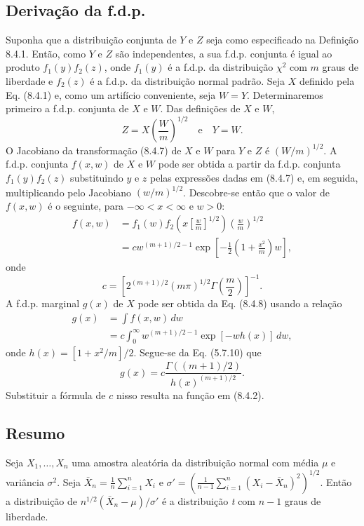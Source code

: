 \subsection*{Derivação da f.d.p.}

Suponha que a distribuição conjunta de $Y$ e $Z$ seja como especificado na Definição 8.4.1. Então, como $Y$ e $Z$ são independentes, a sua f.d.p. conjunta é igual ao produto $f_1(y)f_2(z)$, onde $f_1(y)$ é a f.d.p. da distribuição $\chi^2$ com $m$ graus de liberdade e $f_2(z)$ é a f.d.p. da distribuição normal padrão. Seja $X$ definido pela Eq. (8.4.1) e, como um artifício conveniente, seja $W=Y$. Determinaremos primeiro a f.d.p. conjunta de $X$ e $W$.
Das definições de $X$ e $W$,
\begin{equation} \label{eq:8.4.7}
    Z = X \left(\frac{W}{m}\right)^{1/2} \quad \text{e} \quad Y = W.
\end{equation}
O Jacobiano da transformação (8.4.7) de $X$ e $W$ para $Y$ e $Z$ é $(W/m)^{1/2}$. A f.d.p. conjunta $f(x, w)$ de $X$ e $W$ pode ser obtida a partir da f.d.p. conjunta $f_1(y)f_2(z)$ substituindo $y$ e $z$ pelas expressões dadas em (8.4.7) e, em seguida, multiplicando pelo Jacobiano $(w/m)^{1/2}$. Descobre-se então que o valor de $f(x, w)$ é o seguinte, para $-\infty < x < \infty$ e $w > 0$:
\begin{align} \label{eq:8.4.8}
    f(x, w) &= f_1(w) f_2\left(x\left[\frac{w}{m}\right]^{1/2}\right) \left(\frac{w}{m}\right)^{1/2} \\
    &= c w^{(m+1)/2 - 1} \exp\left[-\frac{1}{2}\left(1 + \frac{x^2}{m}\right)w\right], \nonumber
\end{align}
onde
$$
c = \left[2^{(m+1)/2}(m\pi)^{1/2}\Gamma\left(\frac{m}{2}\right)\right]^{-1}.
$$
A f.d.p. marginal $g(x)$ de $X$ pode ser obtida da Eq. (8.4.8) usando a relação
\begin{align*}
    g(x) &= \int f(x, w) \, dw \\
    &= c \int_{0}^{\infty} w^{(m+1)/2 - 1} \exp[-w h(x)] \, dw,
\end{align*}
onde $h(x) = [1+x^2/m]/2$. Segue-se da Eq. (5.7.10) que
$$
g(x) = c \frac{\Gamma((m+1)/2)}{h(x)^{(m+1)/2}}.
$$
Substituir a fórmula de $c$ nisso resulta na função em (8.4.2).

\subsection*{Resumo}

Seja $X_1, \dots, X_n$ uma amostra aleatória da distribuição normal com média $\mu$ e variância $\sigma^2$. Seja $\bar{X}_n = \frac{1}{n}\sum_{i=1}^n X_i$ e $\sigma' = \left(\frac{1}{n-1}\sum_{i=1}^n(X_i - \bar{X}_n)^2\right)^{1/2}$. Então a distribuição de $n^{1/2}(\bar{X}_n - \mu)/\sigma'$ é a distribuição \textit{t} com $n-1$ graus de liberdade.

